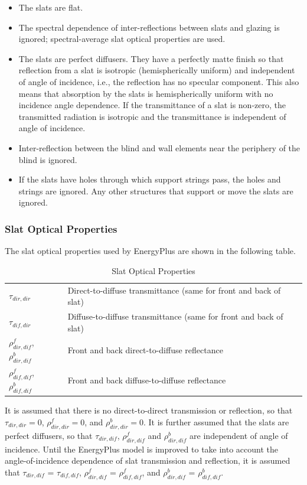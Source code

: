 \begin{itemize}
\item
  The slats are flat.
\item
  The spectral dependence of inter-reflections between slats and glazing is ignored; spectral-average slat optical properties are used.
\item
  The slats are perfect diffusers. They have a perfectly matte finish so that reflection from a slat is isotropic (hemispherically uniform) and independent of angle of incidence, i.e., the reflection has no specular component. This also means that absorption by the slats is hemispherically uniform with no incidence angle dependence. If the transmittance of a slat is non-zero, the transmitted radiation is isotropic and the transmittance is independent of angle of incidence.
\item
  Inter-reflection between the blind and wall elements near the periphery of the blind is ignored.
\item
  If the slats have holes through which support strings pass, the holes and strings are ignored. Any other structures that support or move the slats are ignored.
\end{itemize}

\subsubsection{Slat Optical Properties}\label{slat-optical-properties}

The slat optical properties used by EnergyPlus are shown in the following table.

\begin{longtable}[c]{p{1.5in}p{2.5in}}
\caption{Slat Optical Properties \label{table:slat-optical-properties}} \tabularnewline
\toprule 
\endfirsthead

\caption[]{Slat Optical Properties} \tabularnewline
\toprule
\endhead

\({\tau_{dir,dir}}\) & Direct-to-diffuse transmittance (same for front and back of slat) \tabularnewline
\({\tau_{dif,dir}}\) & Diffuse-to-diffuse transmittance (same for front and back of slat) \tabularnewline
\(\rho_{dir,dif}^f\), \(\rho_{dir,dif}^b\) & Front and back direct-to-diffuse reflectance \tabularnewline
\(\rho_{dif,dif}^f\), \(\rho_{dif,dif}^b\) & Front and back diffuse-to-diffuse reflectance \tabularnewline
\bottomrule
\end{longtable}

It is assumed that there is no direct-to-direct transmission or reflection, so that \({\tau_{dir,dir}} = 0\), \(\rho_{dir,dir}^f = 0\), and \(\rho_{dir,dir}^b = 0\). It is further assumed that the slats are perfect diffusers, so that \({\tau_{dir,dif}}\), \(\rho_{dir,dif}^f\) and \(\rho_{dir,dif}^b\) are independent of angle of incidence. Until the EnergyPlus model is improved to take into account the angle-of-incidence dependence of slat transmission and reflection, it is assumed that \({\tau_{dir,dif}}\) = \({\tau_{dif,dif}}\), \(\rho_{dir,dif}^f\) = \(\rho_{dif,dif}^f\), and \(\rho_{dir,dif}^b\) = \(\rho_{dif,dif}^b\).

